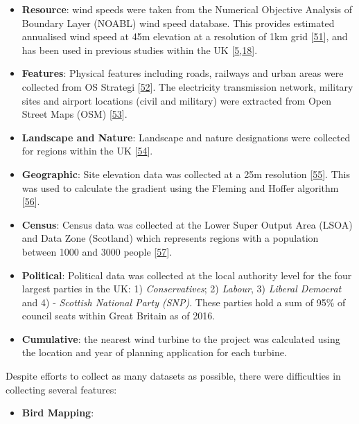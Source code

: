 \documentclass[a4paper,]{article}
\providecommand{\tightlist}{%
  \setlength{\itemsep}{0pt}\setlength{\parskip}{0pt}}
\theoremstyle{definition}
\theoremstyle{definition}
\theoremstyle{definition}
\theoremstyle{remark}
\begin{document}
\begin{itemize}
\tightlist
\item
  \textbf{Resource}: wind speeds were taken from the Numerical Objective
  Analysis of Boundary Layer (NOABL) wind speed database. This provides
  estimated annualised wind speed at 45m elevation at a resolution of
  1km grid {[}\protect\hyperlink{ref-DTI2001}{51}{]}, and has been used
  in previous studies within the UK
  {[}\protect\hyperlink{ref-Baban2001}{5},\protect\hyperlink{ref-Watson2015}{18}{]}.
\item
  \textbf{Features}: Physical features including roads, railways and
  urban areas were collected from OS Strategi
  {[}\protect\hyperlink{ref-Survey2016}{52}{]}. The electricity
  transmission network, military sites and airport locations (civil and
  military) were extracted from Open Street Maps (OSM)
  {[}\protect\hyperlink{ref-Overpass2016}{53}{]}.
\item
  \textbf{Landscape and Nature}: Landscape and nature designations were
  collected for regions within the UK
  {[}\protect\hyperlink{ref-Pope2017}{54}{]}.
\item
  \textbf{Geographic}: Site elevation data was collected at a 25m
  resolution {[}\protect\hyperlink{ref-Commission2015}{55}{]}. This was
  used to calculate the gradient using the Fleming and Hoffer algorithm
  {[}\protect\hyperlink{ref-Fleming1979}{56}{]}.
\item
  \textbf{Census}: Census data was collected at the Lower Super Output
  Area (LSOA) and Data Zone (Scotland) which represents regions with a
  population between 1000 and 3000 people
  {[}\protect\hyperlink{ref-OfficeforNationalStatistics}{57}{]}.\\
\item
  \textbf{Political}: Political data was collected at the local
  authority level for the four largest parties in the UK: 1)
  \emph{Conservatives}; 2) \emph{Labour}, 3) \emph{Liberal Democrat} and
  4) - \emph{Scottish National Party (SNP)}. These parties hold a sum of
  95\% of council seats within Great Britain as of 2016.
\item
  \textbf{Cumulative}: the nearest wind turbine to the project was
  calculated using the location and year of planning application for
  each turbine.
\end{itemize}

Despite efforts to collect as many datasets as possible, there were
difficulties in collecting several features:

\begin{itemize}
\tightlist
\item
  \textbf{Bird Mapping}:
\end{itemize}
\end{document}
